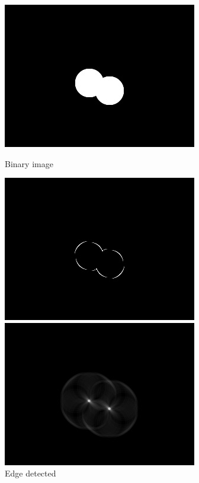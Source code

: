 \begin{figure}[H]
	\includegraphics[width=\linewidth]{images/circles.jpg}
	\caption{Binary image }\label{fig:binary_image}
	\endminipage\hfill
	\includegraphics[width=\linewidth]{images/circle_edges.jpg}
	\caption{Edge detected }\label{fig:edge_detected_image}
	\endminipage\hfill
	\includegraphics[width=\linewidth]{images/hough_circle.jpg}

\end{figure}
